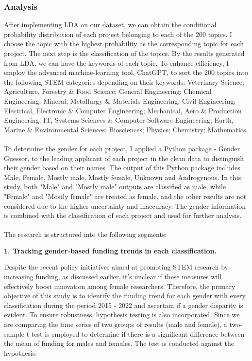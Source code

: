 \subsubsection{Analysis}
\noindent After implementing LDA on our dataset, we can obtain the conditional probability distribution of each project belonging to each of the 200 topics. I choose the topic with the highest probability as the corresponding topic for each project. The next step is the classification of the topics. By the results generated from LDA, we can have the keywords of each topic. To enhance efficiency, I employ the advanced machine-learning tool, ChatGPT, to sort the 200 topics into the following STEM categories depending on their keywords: Veterinary Science; Agriculture, Forestry \& Food Science; General Engineering; Chemical Engineering; Mineral, Metallurgy \& Materials Engineering; Civil Engineering; Electrical, Electronic \& Computer Engineering; Mechanical, Aero \& Production Engineering; IT, Systems Sciences \& Computer Software Engineering; Earth, Marine \& Environmental Sciences; Biosciences; Physics; Chemistry; Mathematics.\\
\\
To determine the gender for each project, I applied a Python package - Gender Guessor, to the leading applicant of each project in the clean data to distinguish their gender based on their names. The output of this Python package includes Male, Female, Mostly male, Mostly female, Unknown and Androgynous.  In this study, both "Male" and "Mostly male" outputs are classified as male, while "Female" and "Mostly female" are treated as female, and the other results are not considered due to the higher uncertainty and inaccuracy. The gender information is combined with the classification of each project and used for further analysis.\\
\\
\noindent The research is structured into the following segments:

\textbf{1. Tracking gender-based funding trends in each classification.}

Despite the recent policy initiatives aimed at promoting STEM research by increasing funding, as discussed earlier, it's unclear if these measures will effectively boost innovation among female researchers. Therefore, the primary objective of this study is to identify the funding trend for each gender with every classification during the period 2015 - 2022 and ascertain if a gender disparity is evident. To ensure robustness, hypothesis testing is also incorporated. Since we are comparing the time series of two groups of results (male and female), a two-sample t-test is employed to determine if there is a significant difference between the mean of funding for males and females. The test is conducted against the hypothesis:

